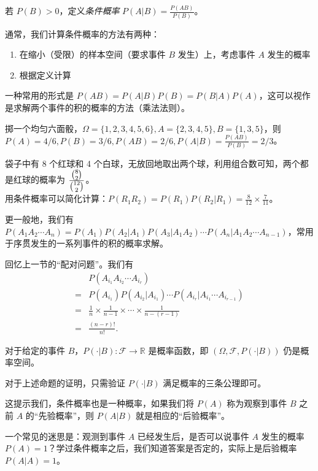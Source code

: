\documentclass[../main.tex]{subfiles}
\begin{document}
\begin{definition}\label{def:1.6.1}
    若 $P(B)>0$，定义\emph{条件概率} $P(A|B)=\frac{P(AB)}{P(B)}$。
\end{definition}

通常，我们计算条件概率的方法有两种：
\begin{enumerate}
    \item 在缩小（受限）的样本空间（要求事件 $B$ 发生）上，考虑事件 $A$ 发生的概率
    \item 根据定义计算
\end{enumerate}

一种常用的形式是 $P(AB)=P(A|B)P(B)=P(B|A)P(A)$，这可以视作是求解两个事件的积的概率的方法（乘法法则）。

\begin{example}
    掷一个均匀六面骰，$\Omega=\{1,2,3,4,5,6\},A=\{2,3,4,5\},B=\{1,3,5\}$，则 $P(A)=4/6,P(B)=3/6,P(AB)=2/6,P(A|B)=\frac{P(AB)}{P(B)}=2/3$。
\end{example}

\begin{example}
    袋子中有 8 个红球和 4 个白球，无放回地取出两个球，利用组合数可知，两个都是红球的概率为 $\frac{\tbinom{8}{2}}{\tbinom{12}{2}}$。\\
    用条件概率可以简化计算：$P(R_1R_2)=P(R_1)P(R_2|R_1)=\frac{8}{12}\times\frac{7}{11}$。
\end{example}

更一般地，我们有 $P(A_1A_2\cdots A_n)=P(A_1)P(A_2|A_1)P(A_3|A_1A_2)\cdots P(A_n|A_1A_2\cdots A_{n-1})$，常用于序贯发生的一系列事件的积的概率求解。

\begin{example}
    回忆上一节的“配对问题”。我们有
    \begin{equation*}
        \begin{aligned}
              & P(A_{i_1}A_{i_2}\cdots A_{i_r})                                         \\
            = & P(A_{i_1})P(A_{i_2}|A_{i_1})\cdots P(A_{i_r}|A_{i_1}\cdots A_{i_{r-1}}) \\
            = & \frac{1}{n}\times\frac{1}{n-1}\times\cdots\times\frac{1}{n-(r-1)}       \\
            = & \frac{(n-r)!}{n!}.
        \end{aligned}
    \end{equation*}
\end{example}

\begin{proposition}
    对于给定的事件 $B$，$P(\cdot|B):\mathcal{F}\rightarrow\mathbb{R}$ 是概率函数，即 $(\Omega,\mathcal{F},P(\cdot|B))$ 仍是概率空间。
\end{proposition}

对于上述命题的证明，只需验证 $P(\cdot|B)$ 满足概率的三条公理即可。

这提示我们，条件概率也是一种概率，如果我们将 $P(A)$ 称为观察到事件 $B$ 之前 $A$ 的“先验概率”，则 $P(A|B)$ 就是相应的“后验概率”。

一个常见的迷思是：观测到事件 $A$ 已经发生后，是否可以说事件 $A$ 发生的概率 $P(A)=1$？学过条件概率之后，我们知道答案是否定的，实际上是后验概率 $P(A|A)=1$。
\end{document}
